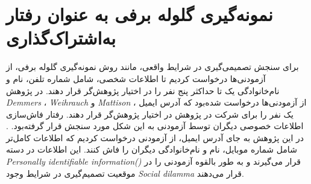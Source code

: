 \section{نمونه‌گیری گلوله برفی به عنوان رفتار به‌اشتراک‌گذاری}
برای سنجش تصمیمی‌گیری در شرایط واقعی، مانند روش نمونه‌گیری گلوله برفی، از آزمودنی‌ها درخواست 
کردیم تا اطلاعات شخصی، شامل شماره تلفن، نام و نام‌خانوادگی یک تا حداکثر پنج نفر را در اختیار پژوهش‌گر قرار دهند.
در پژوهش 
\textit{
	\gls{Demmers}
}،
\textit{
	\gls{Weihrauch}
} و 
\textit{
	\gls{Mattison}
}،
از آزمودنی‌ها درخواست شده‌بود که آدرس ایمیل یک نفر را برای شرکت در پژوهش 
در اختیار پژوهش‌گر قرار دهند. رفتار فاش‌سازی اطلاعات خصوصی دیگران توسط آزمودنی به این شکل مورد سنجش  قرار گرفته‌بود.
\citep{demmersYourDataNot2021}.
در این پژوهش به جای آدرس ایمیل، از آزمودنی درخواست کردیم که اطلاعات کامل‌تر شامل شماره موبایل، نام و نام‌خانوادگی دیگران 
را فاش کنند. این اطلاعات در دسته 
\textit{
	\gls{Personally identifiable information}()
}\citep{mccallisterGuideProtectingConfidentiality2010a}
قرار می‌گیرند و به طور بالقوه آزمودنی را در موقعیت  تصمیم‌گیری در شرایط وجود
\textit{
	\gls{Social dilamma}
}
قرار می‌دهند.